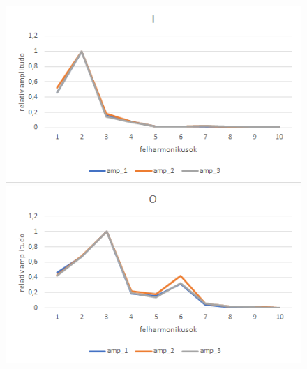 \documentclass[a4paper,12pt]{article}
\begin{document}
\begin{figure}[h!]
\centering
\begin{minipage}{.5\textwidth}
  \centering
  \includegraphics[width=.9\linewidth]{I.png}
\end{minipage}%
\begin{minipage}{.5\textwidth}
  \centering
  \includegraphics[width=.9\linewidth]{O.png}
\end{minipage}
\end{figure}
\end{document}

